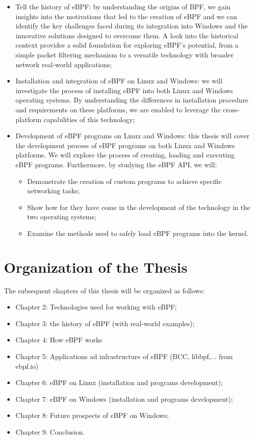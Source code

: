 \begin{itemize}
	\item Tell the history of eBPF: by understanding the origins of BPF, we gain insights into the 		
		motivations that led to the creation of eBPF and we can identify the key challenges faced during its integration into Windows and the innovative solutions designed to overcome them. 
		A look into the historical context provides a solid foundation for exploring eBPF's potential, from a simple packet filtering mechanism to a versatile technology with broader network real-world applications;
	\item Installation and integration of eBPF on Linux and Windows: we will investigate the process of
		installing eBPF into both Linux and Windows operating systems. 
		By understanding the differences in installation procedure and requirements on these platforms, we are enabled to leverage the cross-platform capabilities of this technology;
	\item Development of eBPF programs on Linux and Windows: this thesis will cover the development
		process of eBPF programs on both Linux and Windows platforms. 
		We will explore the process of creating, loading and executing eBPF programs.
		Furthermore, by studying the eBPF API, we will:
		\begin{itemize}
			\item Demonstrate the creation of custom programs to achieve specific networking tasks;
			\item Show how far they have come in the development of the technology in the two operating
				systems;
			\item Examine the methods used to safely load eBPF programs into the kernel. 
		\end{itemize}
\end{itemize}

\section{Organization of the Thesis}


The subsequent chapters of this thesis will be organized as follows:

\begin{itemize}
	\item Chapter 2: Technologies used for working with eBPF;
	\item Chapter 3: the history of eBPF (with real-world examples);
	\item Chapter 4: How eBPF works
	\item Chapter 5: Applications ad infrastructure of eBPF (BCC, libbpf,... from ebpf.io)
	\item Chapter 6: eBPF on Linux (installation and programs development);
	\item Chapter 7: eBPF on Windows (installation and programs development);
	\item Chapter 8: Future prospects of eBPF on Windows;
	\item Chapter 9: Conclusion.
\end{itemize}

